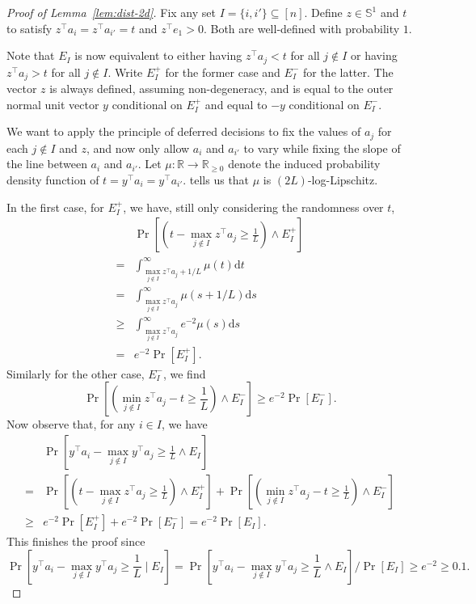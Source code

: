 \documentclass{article}\usepackage[a4paper,margin=20mm]{geometry}
\newcommand{\R}{\mathbb R}
\newcommand{\T}{\top}
\renewcommand{\subset}{\subseteq}
\begin{document}
\begin{proof}[Proof of Lemma~\ref{lem:dist-2d}]
    Fix any set $I = \{i, i'\} \subset [n]$.
    Define $z \in \mathbb S^1$ and $t$ to satisfy $z^\T a_i = z^\T a_{i'} = t$
    and $z^\T e_1 > 0$. Both are well-defined with probability $1$.

    Note that $E_I$ is now equivalent to either having $z^\T a_j < t$ for all $j \notin I$
    or having $z^\T a_j > t$ for all $j \notin I$. Write $E_I^+$ for the former case and $E_I^-$ for the latter.
    The vector $z$ is always defined, assuming non-degeneracy, and is equal to
    the outer normal unit vector $y$ conditional on $E_I^+$ and equal to $-y$ conditional on $E_I^-$.

    We want to apply the principle of deferred decisions to fix the values of $a_j$ for each $j \notin I$
    and $z$, and now only allow $a_{i}$ and $a_{i'}$ to vary while fixing the slope of the line between $a_{i}$ and $a_{i'}$.
    Let $\mu: \R \to \R_{\geq 0}$ denote the induced probability density function of $t = y^\top a_i =  y^\top a_{i'}$.
     tells us that $\mu$ is $(2L)$-log-Lipschitz. 

    In the first case, for $E_I^+$, we have, still only considering the randomness over $t$,
    \begin{align*}
         & \Pr[ (t - \max_{j \notin I} z^\top a_j \geq \frac{1}{L}) \wedge E_I^+] \\
        = & \int_{\max_{j \notin I} z^\top a_j + 1/L}^\infty \mu(t) \mathrm dt \\
        = & \int_{\max_{j \notin I} z^\top a_j}^\infty \mu(s+1/L) \mathrm ds \\
         \geq & \int_{\max_{j \notin I} z^\top a_j}^\infty e^{-2} \mu(s) \mathrm ds \tag{By $(2L)$-log-Lipschitzness of $\mu$} \\
        = & e^{-2} \Pr[E_I^+].
    \end{align*}
    Similarly for the other case, $E_I^-$, we find
    \[
    \Pr[ (\min_{j \notin I} z^\top a_j - t \geq \frac{1}{L}) \wedge E_I^-]
    \geq e^{-2}\Pr[E_I^-].
    \]
    Now observe that, for any $i \in I$, we have
    \begin{align*}
        &\Pr[y^\top a_i - \max_{j \notin I} y^\top a_j \geq \frac{1}{L} \wedge E_I] \\
        =& \Pr[ (t - \max_{j \notin I} z^\top a_j \geq \frac{1}{L}) \wedge E_I^+]
        + \Pr[ (\min_{j \notin I} z^\top a_j  - t\geq \frac{1}{L}) \wedge E_I^-]\\
        \geq & e^{-2} \Pr[E_I^+] + e^{-2}\Pr[E_I^-] = e^{-2}\Pr[E_I].
    \end{align*}
    This finishes the proof since
    \[
    \Pr[y^\top a_i - \max_{j \notin I} y^\top a_j \geq \frac{1}{L} \mid E_I]
    =\Pr[y^\top a_i - \max_{j \notin I} y^\top a_j \geq \frac{1}{L} \wedge E_I]/\Pr[E_I]
    \geq e^{-2} \geq 0.1.
    \]
\end{proof}
\end{document}
